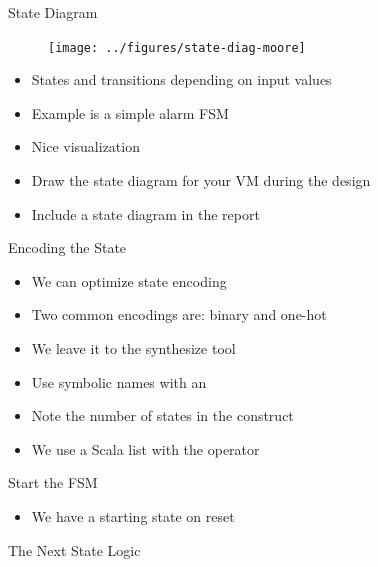 \begin{frame}[fragile]{State Diagram}
\begin{figure}
  \texttt{[image: ../figures/state-diag-moore]}
\end{figure}
\begin{itemize}
\item States and transitions depending on input values
\item Example is a simple alarm FSM
\item Nice visualization
\item Draw the state diagram for your VM during the design
\item Include a state diagram in the report
\end{itemize}
\end{frame}


\begin{frame}[fragile]{Encoding the State}
\begin{itemize}
\item We can optimize state encoding
\item Two common encodings are: binary and one-hot
\item We leave it to the synthesize tool
\item Use symbolic names with an 
\item Note the number of states in the  construct
\item We use a Scala list with the \code{::} operator
\end{itemize}
\end{frame}

\begin{frame}[fragile]{Start the FSM}
\begin{itemize}
\item We have a starting state on reset
\end{itemize}
\end{frame}


\begin{frame}[fragile]{The Next State Logic}
\end{frame}


